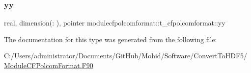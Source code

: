 \subsubsection{\texorpdfstring{yy}{yy}}
{\footnotesize\ttfamily real, dimension(\+:  ), pointer modulecfpolcomformat\+::t\+\_\+cfpolcomformat\+::yy\hspace{0.3cm}{\ttfamily [private]}}



The documentation for this type was generated from the following file\+:\begin{DoxyCompactItemize}
\item 
C\+:/\+Users/administrator/\+Documents/\+Git\+Hub/\+Mohid/\+Software/\+Convert\+To\+H\+D\+F5/\mbox{\hyperlink{_module_c_f_polcom_format_8_f90}{Module\+C\+F\+Polcom\+Format.\+F90}}\end{DoxyCompactItemize}
